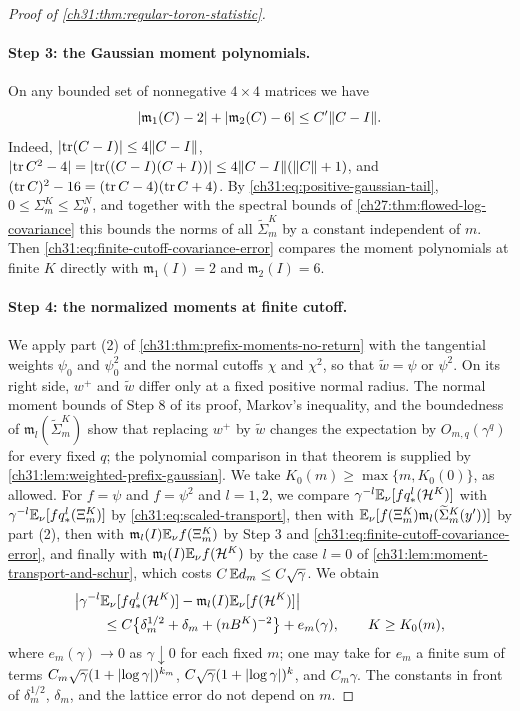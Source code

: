 \begin{proof}[Proof of \cref{ch31:thm:regular-toron-statistic}]
\paragraph{Step 3: the Gaussian moment polynomials.}
On any bounded set of nonnegative $4\times4$ matrices we have
\[
 \lvert \mathfrak m_1(C)-2\rvert+\lvert \mathfrak m_2(C)-6\rvert\le C'\lVert C-I\rVert.
\]
Indeed, $\lvert \operatorname{tr}(C-I)\rvert\le4\lVert C-I\rVert$, $\lvert \operatorname{tr} C^2-4\rvert=\lvert \operatorname{tr}((C-I)(C+I))\rvert\le4\lVert C-I\rVert(\lVert C\rVert+1)$, and $(\operatorname{tr} C)^2-16=(\operatorname{tr} C-4)(\operatorname{tr} C+4)$. By \eqref{ch31:eq:positive-gaussian-tail}, $0\le\Sigma_m^K\le\Sigma_\theta^N$, and together with the spectral bounds of \cref{ch27:thm:flowed-log-covariance} this bounds the norms of all $\widetilde\Sigma_m^K$ by a constant independent of $m$. Then \eqref{ch31:eq:finite-cutoff-covariance-error} compares the moment polynomials at finite $K$ directly with $\mathfrak m_1(I)=2$ and $\mathfrak m_2(I)=6$.

\paragraph{Step 4: the normalized moments at finite cutoff.}
We apply part (2) of \cref{ch31:thm:prefix-moments-no-return} with the tangential weights $\psi_0$ and $\psi_0^2$ and the normal cutoffs $\chi$ and $\chi^2$, so that $\widetilde w=\psi$ or $\psi^2$. On its right side, $w^+$ and $\widetilde w$ differ only at a fixed positive normal radius. The normal moment bounds of Step 8 of its proof, Markov's inequality, and the boundedness of $\mathfrak m_l(\widetilde\Sigma_m^K)$ show that replacing $w^+$ by $\widetilde w$ changes the expectation by $O_{m,q}(\gamma^q)$ for every fixed $q$; the polynomial comparison in that theorem is supplied by \cref{ch31:lem:weighted-prefix-gaussian}. We take $K_0(m)\ge\max\{m,K_0(0)\}$, as allowed. For $f=\psi$ and $f=\psi^2$ and $l=1,2$, we compare $\gamma^{-l}\mathbb E_\nu[fq_*^l(\mathcal H^K)]$ with $\gamma^{-l}\mathbb E_\nu[fq_*^l(\Xi_m^K)]$ by \eqref{ch31:eq:scaled-transport}, then with $\mathbb E_\nu[f(\Xi_m^K)\mathfrak m_l(\widetilde\Sigma_m^K(y'))]$ by part (2), then with $\mathfrak m_l(I)\mathbb E_\nu f(\Xi_m^K)$ by Step 3 and \eqref{ch31:eq:finite-cutoff-covariance-error}, and finally with $\mathfrak m_l(I)\mathbb E_\nu f(\mathcal H^K)$ by the case $l=0$ of \cref{ch31:lem:moment-transport-and-schur}, which costs $C\,\mathbb E d_m\le C\sqrt\gamma$. We obtain
\begin{equation}\label{ch31:eq:selected-moment-modulus}
 \begin{split}
 &\bigl\lvert\gamma^{-l}\mathbb E_\nu[fq_*^l(\mathcal H^K)]-\mathfrak m_l(I)\mathbb E_\nu[f(\mathcal H^K)]\bigr\rvert\\
 &\qquad\le C\bigl\{\delta_m^{1/2}+\delta_m+(nB^K)^{-2}\bigr\}+e_m(\gamma),\qquad K\ge K_0(m),
 \end{split}
\end{equation}
where $e_m(\gamma)\to0$ as $\gamma\downarrow0$ for each fixed $m$; one may take for $e_m$ a finite sum of terms $C_m\sqrt\gamma(1+\lvert \log\gamma\rvert)^{k_m}$, $C\sqrt\gamma(1+\lvert \log\gamma\rvert)^k$, and $C_m\gamma$. The constants in front of $\delta_m^{1/2}$, $\delta_m$, and the lattice error do not depend on $m$.


\end{proof}
